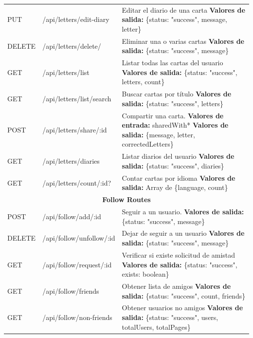 \begin{longtable}{|l|p{5cm}|p{8cm}|}
PUT & /api/letters/edit-diary & Editar el diario de una carta \newline \textbf{Valores de salida:} \{status: "success", message, letter\} \\
DELETE & /api/letters/delete/ & Eliminar una o varias cartas \newline \textbf{Valores de salida:} \{status: "success", message\} \\
GET & /api/letters/list & Listar todas las cartas del usuario \newline \textbf{Valores de salida:} \{status: "success", letters, count\} \\
GET & /api/letters/list/search & Buscar cartas por título \newline \textbf{Valores de salida:} \{status: "success", letters\} \\
POST & /api/letters/share/:id & Compartir una carta. \newline \textbf{Valores de entrada:} shared\-With* \newline \textbf{Valores de salida:} \{message, letter, correctedLetters\} \\
GET & /api/letters/diaries & Listar diarios del usuario \newline \textbf{Valores de salida:} \{status: "success", diaries\} \\
GET & /api/letters/count/:id? & Contar cartas por idioma \newline \textbf{Valores de salida:} Array de \{language, count\} \\
\hline
\hline
\multicolumn{3}{|c|}{\textbf{Follow Routes}} \\
\hline
POST & /api/follow/add/:id & Seguir a un usuario. \newline \textbf{Valores de salida:} \{status: "success", message\} \\
DELETE & /api/follow/unfollow/:id & Dejar de seguir a un usuario \newline \textbf{Valores de salida:} \{status: "success", message\} \\
GET & /api/follow/request/:id & Verificar si existe solicitud de amistad \newline \textbf{Valores de salida:} \{status: "success", exists: boolean\} \\
GET & /api/follow/friends & Obtener lista de amigos \newline \textbf{Valores de salida:} \{status: "success", count, friends\} \\
GET & /api/follow/non-friends & Obtener usuarios no amigos \newline \textbf{Valores de salida:} \{status: "success", users, totalUsers, totalPages\} \\

\end{longtable}
